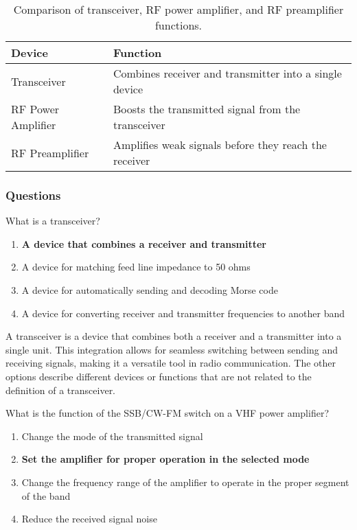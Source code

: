 \begin{table}[h!]
    \centering
    \begin{tabular}{|l|l|}
        \hline
        \textbf{Device} & \textbf{Function} \\
        \hline
        Transceiver & Combines receiver and transmitter into a single device \\
        RF Power Amplifier & Boosts the transmitted signal from the transceiver \\
        RF Preamplifier & Amplifies weak signals before they reach the receiver \\
        \hline
    \end{tabular}
    \caption{Comparison of transceiver, RF power amplifier, and RF preamplifier functions.}
    \label{tab:comparison-functions}
\end{table}

\subsubsection*{Questions}

\begin{tcolorbox}[colback=gray!10!white,colframe=black!75!black,title={T7A02}]
    What is a transceiver?
    \begin{enumerate}[label=\Alph*),noitemsep]
        \item \textbf{A device that combines a receiver and transmitter}
        \item A device for matching feed line impedance to 50 ohms
        \item A device for automatically sending and decoding Morse code
        \item A device for converting receiver and transmitter frequencies to another band
    \end{enumerate}
\end{tcolorbox}

A transceiver is a device that combines both a receiver and a transmitter into a single unit. This integration allows for seamless switching between sending and receiving signals, making it a versatile tool in radio communication. The other options describe different devices or functions that are not related to the definition of a transceiver.

\begin{tcolorbox}[colback=gray!10!white,colframe=black!75!black,title={T7A09}]
    What is the function of the SSB/CW-FM switch on a VHF power amplifier?
    \begin{enumerate}[label=\Alph*),noitemsep]
        \item Change the mode of the transmitted signal
        \item \textbf{Set the amplifier for proper operation in the selected mode}
        \item Change the frequency range of the amplifier to operate in the proper segment of the band
        \item Reduce the received signal noise
    \end{enumerate}
\end{tcolorbox}

